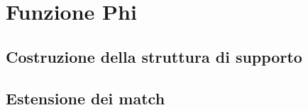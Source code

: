 \section{Funzione Phi}
\label{secphi}
\subsection{Costruzione della struttura di supporto}
\subsection{Estensione dei match}